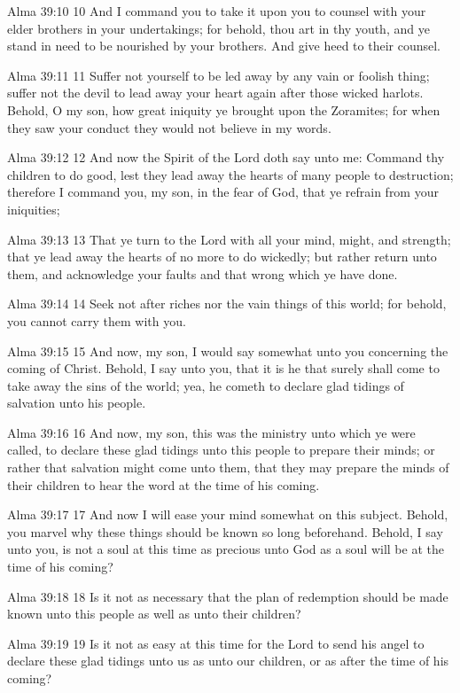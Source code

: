 Alma 39:10
 10 And I command you to take it upon you to counsel with your
elder brothers in your undertakings; for behold, thou art in thy
youth, and ye stand in need to be nourished by your brothers.
And give heed to their counsel.

Alma 39:11
 11 Suffer not yourself to be led away by any vain or foolish
thing; suffer not the devil to lead away your heart again after
those wicked harlots. Behold, O my son, how great iniquity ye
brought upon the Zoramites; for when they saw your conduct they
would not believe in my words.

Alma 39:12
 12 And now the Spirit of the Lord doth say unto me: Command thy
children to do good, lest they lead away the hearts of many
people to destruction; therefore I command you, my son, in the
fear of God, that ye refrain from your iniquities;

Alma 39:13
 13 That ye turn to the Lord with all your mind, might, and
strength; that ye lead away the hearts of no more to do wickedly;
but rather return unto them, and acknowledge your faults and that
wrong which ye have done.

Alma 39:14
 14 Seek not after riches nor the vain things of this world; for
behold, you cannot carry them with you.

Alma 39:15
 15 And now, my son, I would say somewhat unto you concerning the
coming of Christ. Behold, I say unto you, that it is he that
surely shall come to take away the sins of the world; yea, he
cometh to declare glad tidings of salvation unto his people.

Alma 39:16
 16 And now, my son, this was the ministry unto which ye were
called, to declare these glad tidings unto this people to prepare
their minds; or rather that salvation might come unto them, that
they may prepare the minds of their children to hear the word at
the time of his coming.

Alma 39:17
 17 And now I will ease your mind somewhat on this subject.
Behold, you marvel why these things should be known so long
beforehand. Behold, I say unto you, is not a soul at this time
as precious unto God as a soul will be at the time of his coming?

Alma 39:18
 18 Is it not as necessary that the plan of redemption should be
made known unto this people as well as unto their children?

Alma 39:19
 19 Is it not as easy at this time for the Lord to send his angel
to declare these glad tidings unto us as unto our children, or as
after the time of his coming?

